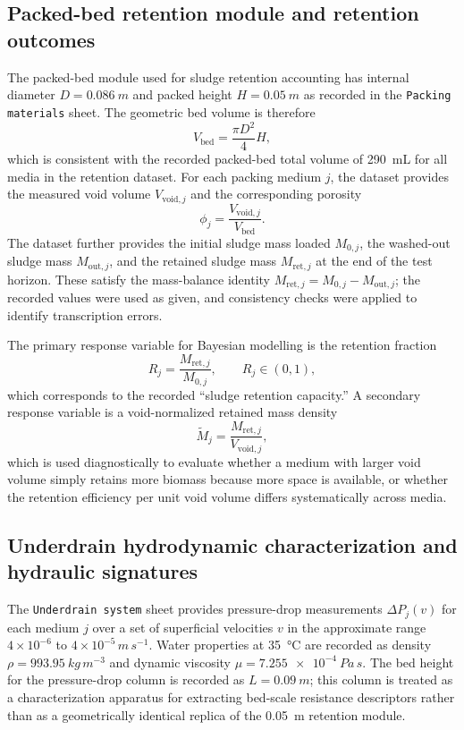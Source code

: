 \documentclass[12pt,a4paper]{article}
\begin{document}
\subsection{Packed-bed retention module and retention outcomes}
The packed-bed module used for sludge retention accounting has internal diameter $D=\SI{0.086}{m}$ and packed height $H=\SI{0.05}{m}$ as recorded in the \texttt{Packing materials} sheet. The geometric bed volume is therefore
\begin{equation}
V_{\mathrm{bed}}=\frac{\pi D^2}{4}H,
\end{equation}
which is consistent with the recorded packed-bed total volume of \SI{290}{mL} for all media in the retention dataset. For each packing medium $j$, the dataset provides the measured void volume $V_{\mathrm{void},j}$ and the corresponding porosity
\begin{equation}
\phi_j=\frac{V_{\mathrm{void},j}}{V_{\mathrm{bed}}}.
\end{equation}
The dataset further provides the initial sludge mass loaded $M_{0,j}$, the washed-out sludge mass $M_{\mathrm{out},j}$, and the retained sludge mass $M_{\mathrm{ret},j}$ at the end of the test horizon. These satisfy the mass-balance identity $M_{\mathrm{ret},j}=M_{0,j}-M_{\mathrm{out},j}$; the recorded values were used as given, and consistency checks were applied to identify transcription errors.

The primary response variable for Bayesian modelling is the retention fraction
\begin{equation}
R_j=\frac{M_{\mathrm{ret},j}}{M_{0,j}}, \qquad R_j\in(0,1),
\end{equation}
which corresponds to the recorded ``sludge retention capacity.'' A secondary response variable is a void-normalized retained mass density
\begin{equation}
\tilde{M}_j=\frac{M_{\mathrm{ret},j}}{V_{\mathrm{void},j}},
\end{equation}
which is used diagnostically to evaluate whether a medium with larger void volume simply retains more biomass because more space is available, or whether the retention efficiency per unit void volume differs systematically across media.

\subsection{Underdrain hydrodynamic characterization and hydraulic signatures}
The \texttt{Underdrain system} sheet provides pressure-drop measurements $\Delta P_{j}(v)$ for each medium $j$ over a set of superficial velocities $v$ in the approximate range $4\times 10^{-6}$ to $4\times 10^{-5}\,\si{m\,s^{-1}}$. Water properties at \SI{35}{\celsius} are recorded as density $\rho=\SI{993.95}{kg\,m^{-3}}$ and dynamic viscosity $\mu=\SI{7.255e-4}{Pa\,s}$. The bed height for the pressure-drop column is recorded as $L=\SI{0.09}{m}$; this column is treated as a characterization apparatus for extracting bed-scale resistance descriptors rather than as a geometrically identical replica of the \SI{0.05}{m} retention module.
\end{document}
